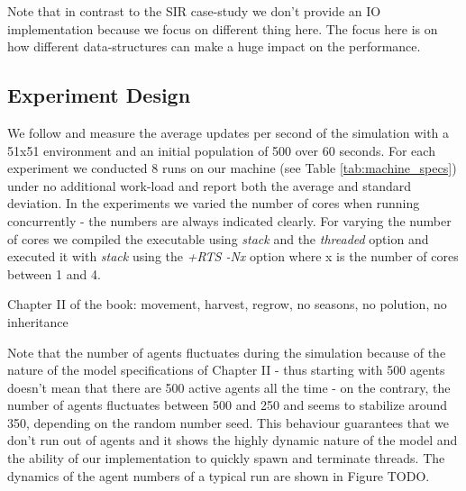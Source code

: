 Note that in contrast to the SIR case-study we don't provide an IO implementation because we focus on different thing here. The focus here is on how different data-structures can make a huge impact on the performance.

%

\subsection{Experiment Design}
We follow \cite{lysenko_framework_2008} and measure the average updates per second of the simulation with a 51x51 environment and an initial population of 500 over 60 seconds. For each experiment we conducted 8 runs on our machine (see Table \ref{tab:machine_specs}) under no additional work-load and report both the average and standard deviation. In the experiments we varied the number of cores when running concurrently - the numbers are always indicated clearly. For varying the number of cores we compiled the executable using \textit{stack} and the \textit{threaded} option and executed it with \textit{stack} using the \textit{+RTS -Nx} option where x is the number of cores between 1 and 4.

Chapter II of the book: movement, harvest, regrow, no seasons, no polution, no inheritance

Note that the number of agents fluctuates during the simulation because of the nature of the model specifications of Chapter II - thus starting with 500 agents doesn't mean that there are 500 active agents all the time - on the contrary, the number of agents fluctuates between 500 and 250 and seems to stabilize around 350, depending on the random number seed. This behaviour guarantees that we don't run out of agents and it shows the highly dynamic nature of the model and the ability of our implementation to quickly spawn and terminate threads. The dynamics of the agent numbers of a typical run are shown in Figure TODO.  

